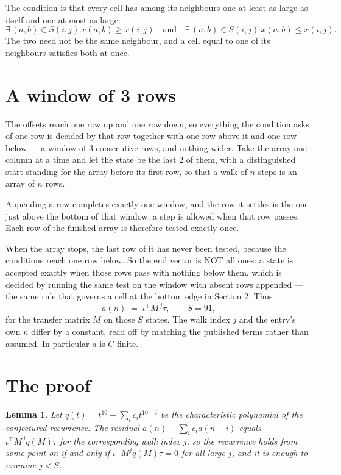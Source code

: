 \documentclass[11pt,a4paper]{article}
\theoremstyle{plain}
\newtheorem{lemma}[theorem]{Lemma}
\theoremstyle{definition}
\begin{document}
The condition is that every cell has among its neighbours one at least as large as itself and one at most as large:
\[
\exists\,(a,b)\in S(i,j)\ x(a,b)\ge x(i,j)\quad\text{and}\quad\exists\,(a,b)\in S(i,j)\ x(a,b)\le x(i,j).
\]
The two need not be the same neighbour, and a cell equal to one of its neighbours satisfies both at once.

\section{A window of 3 rows}

The offsets reach one row up and one row down, so everything the condition asks of one row is
decided by that row together with one row above it and one row below --- a window of
$3$ consecutive rows, and nothing wider. Take the array one column at a time and
let the state be the last 2 of them, with a distinguished start standing for the array before its
first row, so that a walk of $n$ steps is an array of $n$ rows.

Appending a row completes exactly one window, and the row it settles is the one just above the bottom of that window; a step is
allowed when that row passes. Each row of the finished array is therefore tested exactly once.

When the array stops, the last row of it has never been tested, because the
conditions reach one row below. So the end vector is NOT all ones: a state is accepted exactly when
those rows pass with nothing below them, which is decided by running the same test on the window
with absent rows appended --- the same rule that governs a cell at the bottom edge in
Section 2.
Thus
\[
a(n)\;=\;\iota^{\!\top}M^{\,j}\tau ,\qquad S=91,
\]
for the transfer matrix $M$ on those $S$ states. The walk index $j$ and the entry's own $n$
differ by a constant, read off by matching the published terms rather than assumed. In
particular $a$ is $C$-finite.

\section{The proof}

\begin{lemma}\label{lem:crit}
Let $q(t)=t^{10}-\sum_i c_it^{10-i}$ be the characteristic polynomial of the
conjectured recurrence. The residual $a(n)-\sum_ic_ia(n-i)$ equals
$\iota^{\!\top}M^{\,j}q(M)\tau$ for the corresponding walk index $j$, so the recurrence
holds from some point on if and only if $\iota^{\!\top}M^{j}q(M)\tau=0$ for all large $j$,
and it is enough to examine $j<S$.
\end{lemma}
\end{document}
